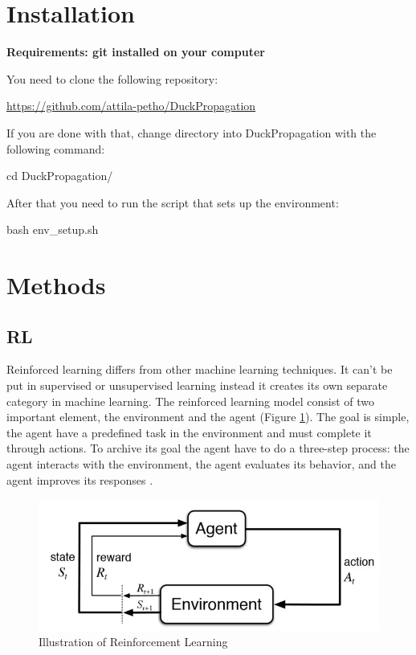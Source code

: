 \documentclass{article}
\begin{document}
\section{\large{Installation}}

\textbf{Requirements: git installed on your computer}

You need to clone the following repository:\\
\begin{center}
  \url{https://github.com/attila-petho/DuckPropagation}
\end{center}

If you are done with that, change directory into DuckPropagation with the following command:
\begin{center}
	cd DuckPropagation/
\end{center}
After that you need to run the script that sets up the environment:
\begin{center}
	bash env\_setup.sh
\end{center}

\section{\large{Methods}}

\subsection{\normalsize{RL}}

Reinforced learning differs from other machine learning techniques. It can't be put in supervised or unsupervised learning instead it creates its own separate category in machine learning. The reinforced learning model consist of two important element, the environment and the agent (Figure \ref{fig:statemachin}). The goal is simple, the agent have a predefined task in the environment and must complete it through actions. To archive its goal the agent have to do a three-step process: the agent interacts with the environment, the agent evaluates its behavior, and the agent improves its responses \cite{dlr_book}.


\begin{figure}[h!]
	\centering
	\includegraphics[width=0.8\linewidth]{rl.jpg}
	\caption{Illustration of Reinforcement Learning}
	\label{fig:statemachin}
\end{figure}
\end{document}
